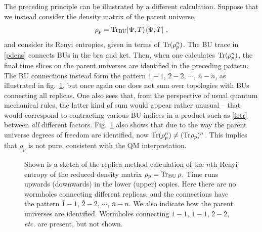 \documentclass[11pt]{article}
\numberwithin{equation}{section}
\newcommand{\beq}{\begin{equation}}
\newcommand{\eeq}{\end{equation}}
\newcommand{\Tr}{{\rm Tr}}
\begin{document}
The preceding principle can be illustrated by a different calculation.  Suppose that we instead consider the density matrix of the parent universe,
\beq\label{pdens}
\rho_p = \Tr_{\rm BU} |\Psi, T\rangle \langle\Psi, T|\ ,
\eeq
and consider its Renyi entropies, given in terms of $\Tr(\rho_p^n)$.  The BU trace in \eqref{pdens} connects BUs in the bra and ket.  Then, when one calculates $\Tr(\rho_p^n)$, the final time slices on the parent universes are identified in the preceding pattern.  The BU connections instead form the pattern ${\bar 1}-1$, ${\bar 2}-2$, $\cdots$, ${\bar n} - n$, as illustrated in fig.~\ref{fig:whrep2}, 
but once again one does not sum over topologies with BUs connecting all replicas.  One also sees that, from the perspective of usual quantum mechanical rules, the latter kind of sum would appear rather unusual -- that would correspond to contracting various BU indices in a product such as \eqref{trtr} between {\it all} different factors. Fig.~\ref{fig:whrep2} also shows that due to the way the parent universe degrees of freedom are identified, now ${\rm Tr}(\rho_p^n)\neq({\rm Tr} \rho_p)^n$. This implies that $\rho_p$ is not pure, consistent with the QM interpretation. 
\begin{figure}[t!]
\begin{center}
 \caption{\label{fig:whrep2}Shown is a sketch of the replica method calculation of the $n$th Renyi entropy of the reduced density matrix $\rho_p = {\rm Tr}_{\rm BU} \,\rho$. Time runs upwards (downwards) in the lower (upper) copies. Here there are no wormholes connecting different replicas, and the connections have the pattern ${\bar 1}-1$, ${\bar 2}-2$, $\cdots$, ${\bar n} - n$.  We also indicate how the parent universes are identified. Wormholes connecting $1-1$, $\bar{1}-\bar{1}$, $2-2$, {\it etc.} are present, but not shown.}
\end{center}
\end{figure}
\end{document}
